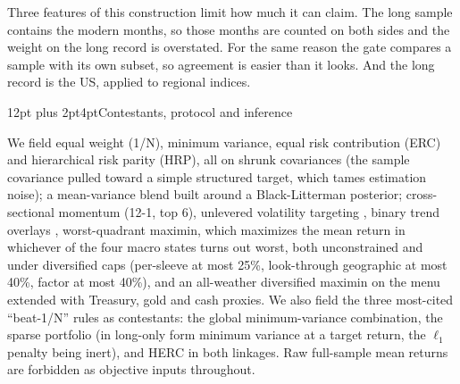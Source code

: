 \documentclass[12pt,letterpaper]{article}
\makeatletter
\newcommand{\nuevo}[1]{{\color{nuevoc}#1}}
\newenvironment{nuevotexto}{\par\color{nuevoc}}{\par}
\renewcommand{\subsection}{\@startsection{subsection}{2}{\parindent}%
  {12pt plus 2pt}{4pt}{\normalfont\bfseries}}
\makeatother
\begin{document}
\begin{nuevotexto}
Three features of this construction limit how much it can claim. The long sample contains the modern
months, so those months are counted on both sides and the weight on the long record is overstated.
For the same reason the gate compares a sample with its own subset, so agreement is easier than
it looks. And the long record is the US, applied to regional indices.
\end{nuevotexto}

\subsection{Contestants, protocol and inference}

We field equal weight (1/N), minimum variance, equal risk contribution (ERC) and
hierarchical risk parity (HRP), all on \citet{ledoit2004} shrunk covariances\nuevo{ (the
sample covariance pulled toward a simple structured target, which tames estimation noise)}; a
mean-variance blend built around a Black-Litterman posterior;
cross-sectional momentum (12-1, top 6), unlevered volatility targeting
\citep{moreira2017}, binary trend overlays \citep{faber2007,antonacci2014},
worst-quadrant maximin, which maximizes the mean return in whichever of the four macro states turns out worst, both unconstrained and under diversified caps (per-sleeve at most 25\%, look-through geographic at most 40\%, factor at most 40\%), and an
all-weather diversified maximin on the menu extended with Treasury, gold and cash
proxies. We also field the three most-cited ``beat-1/N'' rules as contestants: the
\citet{yuan2023} global minimum-variance combination, the \citet{brodie2009}
sparse portfolio (in long-only form minimum variance at a target return, the
$\ell_1$ penalty being inert), and HERC in both linkages. Raw full-sample mean
returns are forbidden as objective inputs throughout.
\end{document}
